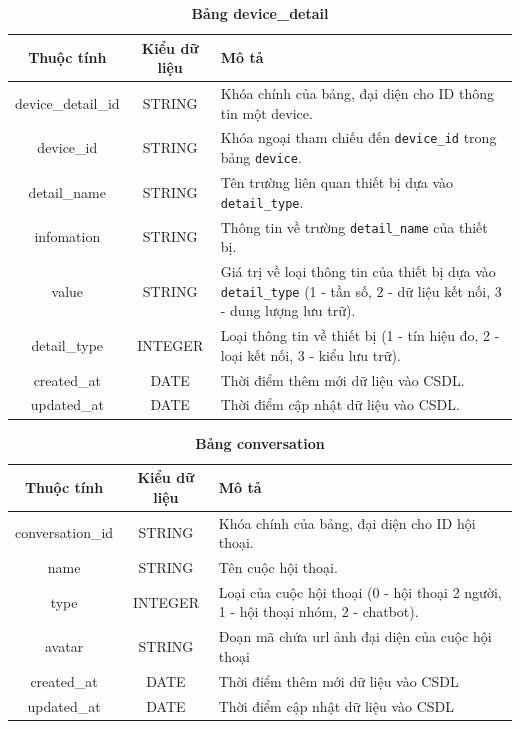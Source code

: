 \begin{table}[H]
  \caption{\bfseries \fontsize{12pt}{0pt}\selectfont Bảng device\_detail}
  \centering
  \begin{tabularx}{0.9\textwidth}{|c|c|X|}
    \hline
    \textbf{Thuộc tính} & \textbf{Kiểu dữ liệu} & \textbf{Mô tả} \\
    \hline
    device\_detail\_id & STRING & Khóa chính của bảng, đại diện cho ID thông tin một device. \\
    \hline
    device\_id & STRING & Khóa ngoại tham chiếu đến \texttt{device\_id} trong bảng \texttt{device}. \\
    \hline
    detail\_name & STRING & Tên trường liên quan thiết bị dựa vào \texttt{detail\_type}. \\
    \hline
    infomation & STRING & Thông tin về trường \texttt{detail\_name} của thiết bị. \\
    \hline
    value & STRING & Giá trị về loại thông tin của thiết bị dựa vào \texttt{detail\_type} (1 - tần số, 2 - dữ liệu kết nối, 3 - dung lượng lưu trữ). \\
    \hline
    detail\_type & INTEGER & Loại thông tin về thiết bị (1 - tín hiệu đo, 2 - loại kết nối, 3 - kiểu lưu trữ). \\
    \hline
    created\_at & DATE & Thời điểm thêm mới dữ liệu vào CSDL. \\
    \hline
    updated\_at & DATE & Thời điểm cập nhật dữ liệu vào CSDL. \\
    \hline
  \end{tabularx}
\end{table}

\begin{table}[H]
  \caption{\bfseries \fontsize{12pt}{0pt}\selectfont Bảng conversation}
  \centering
  \begin{tabularx}{0.9\textwidth}{|c|c|X|}
    \hline
    \textbf{Thuộc tính} & \textbf{Kiểu dữ liệu} & \textbf{Mô tả} \\
    \hline
    conversation\_id & STRING & Khóa chính của bảng, đại diện cho ID hội thoại. \\
    \hline
    name & STRING & Tên cuộc hội thoại. \\
    \hline
    type & INTEGER & Loại của cuộc hội thoại (0 - hội thoại 2 người, 1 - hội thoại nhóm, 2 - chatbot). \\
    \hline
    avatar & STRING & Đoạn mã chứa url ảnh đại diện của cuộc hội thoại  \\
    \hline
    created\_at & DATE & Thời điểm thêm mới dữ liệu vào CSDL \\
    \hline
    updated\_at & DATE & Thời điểm cập nhật dữ liệu vào CSDL \\
    \hline
  \end{tabularx}
\end{table}

